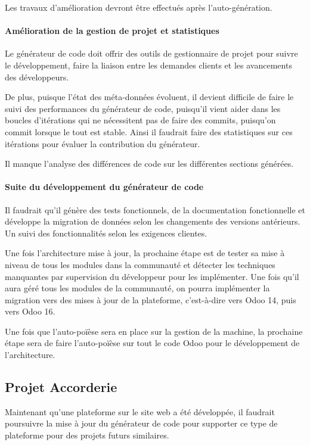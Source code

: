 Les travaux d’amélioration devront être effectués après l’auto-génération.

\paragraph{Amélioration de la gestion de projet et statistiques}

Le générateur de code doit offrir des outils de gestionnaire de projet pour suivre le développement, faire la liaison entre les demandes clients et les avancements des développeurs.

De plus, puisque l’état des méta-données évoluent, il devient difficile de faire le suivi des performances du générateur de code, puisqu’il vient aider dans les boucles d’itérations qui ne nécessitent pas de faire des commits, puisqu’on commit lorsque le tout est stable. Ainsi il faudrait faire des statistiques sur ces itérations pour évaluer la contribution du générateur.

Il manque l’analyse des différences de code sur les différentes sections générées.

\paragraph{Suite du développement du générateur de code}

Il faudrait qu’il génère des tests fonctionnels, de la documentation fonctionnelle et développe la migration de données selon les changements des versions antérieurs. Un suivi des fonctionnalités selon les exigences clientes.

Une fois l’architecture mise à jour, la prochaine étape est de tester sa mise à niveau de tous les modules dans la communauté et détecter les techniques manquantes par supervision du développeur pour les implémenter. Une fois qu’il aura géré tous les modules de la communauté, on pourra implémenter la migration vers des mises à jour de la plateforme, c’est-à-dire vers Odoo 14, puis vers Odoo 16.

Une fois que l’auto-poïèse sera en place sur la gestion de la machine, la prochaine étape sera de faire l’auto-poïèse sur tout le code Odoo pour le développement de l’architecture.

\subsection{Projet Accorderie}
Maintenant qu’une plateforme sur le site web a été développée, il faudrait poursuivre la mise à jour du générateur de code pour supporter ce type de plateforme pour des projets futurs similaires.

